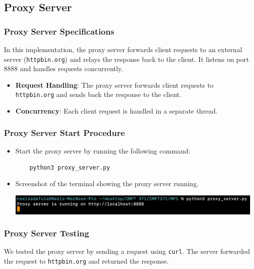 \documentclass{article}
\begin{document}
\subsection*{Proxy Server}

\subsubsection*{Proxy Server Specifications}

In this implementation, the proxy server forwards client requests to an external server (\texttt{httpbin.org}) and relays the response back to the client. It listens on port 8888 and handles requests concurrently.

\begin{itemize}
    \item \textbf{Request Handling}: The proxy server forwards client requests to \texttt{httpbin.org} and sends back the response to the client.
    \item \textbf{Concurrency}: Each client request is handled in a separate thread.
\end{itemize}

\subsubsection*{Proxy Server Start Procedure}

\begin{itemize}
    \item Start the proxy server by running the following command:
    \begin{lstlisting}
    python3 proxy_server.py
    \end{lstlisting}
    \item Screenshot of the terminal showing the proxy server running.
    \begin{center}
        \includegraphics[width=\textwidth]{screenshots/proxy_server_start.png}  %
    \end{center}
\end{itemize}

\subsubsection*{Proxy Server Testing}

We tested the proxy server by sending a request using \texttt{curl}. The server forwarded the request to \texttt{httpbin.org} and returned the response.
\end{document}
